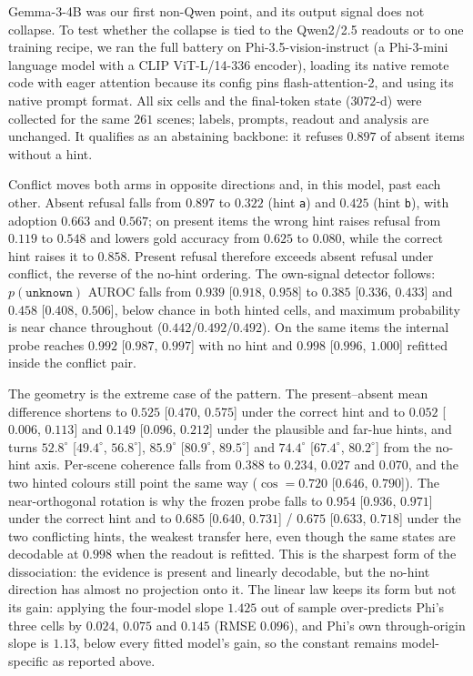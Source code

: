 \documentclass[10pt]{article}
\newcommand{\unknown}{\texttt{unknown}}
\newcommand{\punk}{p(\unknown)}
\begin{document}
Gemma-3-4B was our first non-Qwen point, and its output signal does not collapse. To test whether the collapse is tied to the Qwen2/2.5 readouts or to one training recipe, we ran the full battery on Phi-3.5-vision-instruct (a Phi-3-mini language model with a CLIP ViT-L/14-336 encoder), loading its native remote code with eager attention because its config pins flash-attention-2, and using its native prompt format. All six cells and the final-token state ($3072$-d) were collected for the same $261$ scenes; labels, prompts, readout and analysis are unchanged. It qualifies as an abstaining backbone: it refuses $0.897$ of absent items without a hint.

Conflict moves both arms in opposite directions and, in this model, past each other. Absent refusal falls from $0.897$ to $0.322$ (hint \texttt{a}) and $0.425$ (hint \texttt{b}), with adoption $0.663$ and $0.567$; on present items the wrong hint raises refusal from $0.119$ to $0.548$ and lowers gold accuracy from $0.625$ to $0.080$, while the correct hint raises it to $0.858$. Present refusal therefore exceeds absent refusal under conflict, the reverse of the no-hint ordering. The own-signal detector follows: $\punk$ AUROC falls from $0.939$ [$0.918$, $0.958$] to $0.385$ [$0.336$, $0.433$] and $0.458$ [$0.408$, $0.506$], below chance in both hinted cells, and maximum probability is near chance throughout ($0.442$/$0.492$/$0.492$). On the same items the internal probe reaches $0.992$ [$0.987$, $0.997$] with no hint and $0.998$ [$0.996$, $1.000$] refitted inside the conflict pair.

The geometry is the extreme case of the pattern. The present--absent mean difference shortens to $0.525$ [$0.470$, $0.575$] under the correct hint and to $0.052$ [$0.006$, $0.113$] and $0.149$ [$0.096$, $0.212$] under the plausible and far-hue hints, and turns $52.8^\circ$ [$49.4^\circ$, $56.8^\circ$], $85.9^\circ$ [$80.9^\circ$, $89.5^\circ$] and $74.4^\circ$ [$67.4^\circ$, $80.2^\circ$] from the no-hint axis. Per-scene coherence falls from $0.388$ to $0.234$, $0.027$ and $0.070$, and the two hinted colours still point the same way ($\cos=0.720$ [$0.646$, $0.790$]). The near-orthogonal rotation is why the frozen probe falls to $0.954$ [$0.936$, $0.971$] under the correct hint and to $0.685$ [$0.640$, $0.731$] / $0.675$ [$0.633$, $0.718$] under the two conflicting hints, the weakest transfer here, even though the same states are decodable at $0.998$ when the readout is refitted. This is the sharpest form of the dissociation: the evidence is present and linearly decodable, but the no-hint direction has almost no projection onto it. The linear law keeps its form but not its gain: applying the four-model slope $1.425$ out of sample over-predicts Phi's three cells by $0.024$, $0.075$ and $0.145$ (RMSE $0.096$), and Phi's own through-origin slope is $1.13$, below every fitted model's gain, so the constant remains model-specific as reported above.
\end{document}
